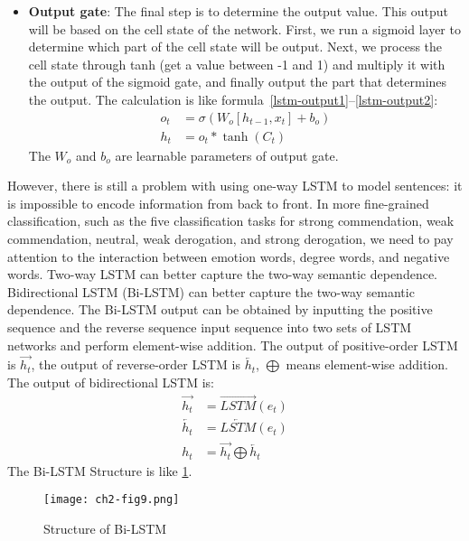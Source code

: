 \begin{itemize}
	\item \textbf{Output gate}: The final step is to determine the output value. This output will be based on the cell state of the network. First, we run a sigmoid layer to determine which part of the cell state will be output. Next, we process the cell state through tanh (get a value between -1 and 1) and multiply it with the output of the sigmoid gate, and finally output the part that determines the output. The calculation is like formula~\ref{lstm-output1}--\ref{lstm-output2}:
	      \begin{align}
		      o_{t} & =\sigma(W_{o}[h_{t-1}, x_{t}]+b_{o}) \label{lstm-output1} \\
		      h_{t} & =o_{t} * \tanh (C_{t}) \label{lstm-output2}
	      \end{align}
	      The \(W_o\) and \(b_o\) are learnable parameters of output gate.
\end{itemize}

However, there is still a problem with using one-way LSTM to model sentences: it is impossible to encode information from back to front. In more fine-grained classification, such as the five classification tasks for strong commendation, weak commendation, neutral, weak derogation, and strong derogation, we need to pay attention to the interaction between emotion words, degree words, and negative words. Two-way LSTM can better capture the two-way semantic dependence. Bidirectional LSTM (Bi-LSTM) can better capture the two-way semantic dependence. The Bi-LSTM output can be obtained by inputting the positive sequence and the reverse sequence input sequence into two sets of LSTM networks and perform element-wise addition. The output of positive-order LSTM is \(\overrightarrow{h_t}\), the output of reverse-order LSTM is \(\overleftarrow{h_t}\), \(\bigoplus \) means element-wise addition. The output of bidirectional LSTM is:
\begin{align}
	\overrightarrow{h_t} & = \overrightarrow{LSTM}(e_t)                       \\
	\overleftarrow{h_t}  & = \overleftarrow{LSTM}(e_t)                        \\
	h_t                  & =\overrightarrow{h_t}\bigoplus \overleftarrow{h_t}
\end{align}
The Bi-LSTM Structure is like \figurename{\ref{ch2-fig9}}.

\begin{figure}[h]
	\centering
	\texttt{[image: ch2-fig9.png]}
	\caption{Structure of Bi-LSTM}\label{ch2-fig9}
\end{figure}

